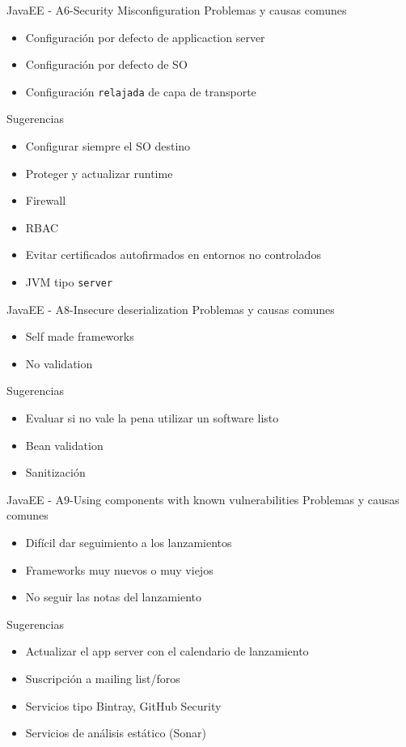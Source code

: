 \documentclass[aspectratio=169]{beamer}
\begin{document}
\begin{frame}{JavaEE - A6-Security Misconfiguration}
    Problemas y causas comunes
    \begin{itemize}
        \item Configuración por defecto de applicaction server
        \item Configuración por defecto de SO
        \item Configuración \texttt{relajada} de capa de transporte
    \end{itemize}
    
    Sugerencias
    \begin{itemize}
        \item Configurar siempre el SO destino
        \item Proteger y actualizar runtime
        \item Firewall
        \item RBAC
        \item Evitar certificados autofirmados en entornos no controlados
        \item JVM tipo \texttt{server}
    \end{itemize}
\end{frame}


\begin{frame}{JavaEE - A8-Insecure deserialization}
    Problemas y causas comunes
    \begin{itemize}
        \item Self made frameworks
        \item No validation
    \end{itemize}
    
    Sugerencias
    \begin{itemize}
        \item Evaluar si no vale la pena utilizar un software listo
        \item Bean validation
        \item Sanitización
    \end{itemize}
\end{frame}


\begin{frame}{JavaEE - A9-Using components with known vulnerabilities}
    Problemas y causas comunes
    \begin{itemize}
        \item Difícil dar seguimiento a los lanzamientos
        \item Frameworks muy nuevos o muy viejos
        \item No seguir las notas del lanzamiento
    \end{itemize}
    
    Sugerencias
    \begin{itemize}
        \item Actualizar el app server con el calendario de lanzamiento
        \item Suscripción a mailing list/foros
        \item Servicios tipo Bintray, GitHub Security
        \item Servicios de análisis estático (Sonar)
    \end{itemize}
\end{frame}
\end{document}
